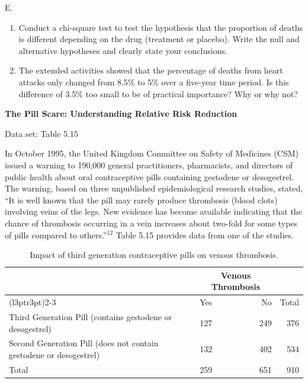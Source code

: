 \documentclass[
]{report}
\newcounter{excount}
\renewcommand{\theexcount}{E\arabic{excount}}
\begin{document}
\begin{list}{\theexcount.}{ \setlength{\itemsep}{0.5em}}
  \begin{enumerate}
    \item Conduct a chi-square test to test the hypothesis that the proportion of deaths is different depending on the drug (treatment or placebo). Write the null and alternative hypotheses and clearly state your conclusions.
    \item The extended activities showed that the percentage of deaths from heart attacks only changed from 8.5\% to 5\% over a five-year time period. Is this difference of 3.5\% too small to be of practical importance? Why or why not?
  \end{enumerate}

  \item \textbf{The Pill Scare: Understanding Relative Risk Reduction}    

  Data set: Table 5.15 
  
  In October 1995, the United Kingdom Committee on Safety of Medicines (CSM) issued a warning to 190,000 general practitioners, pharmacists, and directors of public health about oral contraceptive pills containing gestodene or desogestrel. The warning, based on three unpublished epidemiological research studies, stated, “It is well known that the pill may rarely produce thrombosis (blood clots) involving veins of the legs. New evidence has become available indicating that the chance of thrombosis occurring in a vein increases about two-fold for some types of pills compared to others.”$^{12}$ Table 5.15 provides data from one of the studies.  

\begin{table}[!h]
\centering
\caption{\label{tab:tab15} Impact of third generation contraceptive pills on venous thrombosis.}
\centering
\begin{tabular}[t]{>{\raggedright\arraybackslash}p{6cm}lrr}
\toprule
\multicolumn{1}{c}{ } & \multicolumn{2}{c}{Venous Thrombosis} & \multicolumn{1}{c}{ } \\
\cmidrule(l{3pt}r{3pt}){2-3}
  & Yes & No & Total\\
\midrule
Third Generation Pill
(contains gestodene or desogestrel) & 127 & 249 & 376\\
Second Generation Pill
(does not contain gestodene or desogestrel) & 132 & 402 & 534\\
Total & 259 & 651 & 910\\
\bottomrule
\end{tabular}
\end{table}


\end{list}
\end{document}
